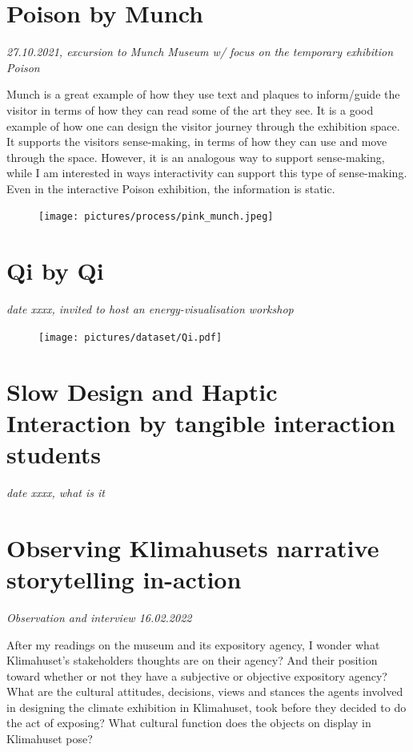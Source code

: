 \section{Poison by Munch}
\par
\emph{27.10.2021, excursion to Munch Museum w/ focus on the temporary exhibition Poison}
\par

Munch is a great example of how they use text and plaques to inform/guide the visitor in terms of how they can read some of the art they see. It is a good example of how one can design the visitor journey through the exhibition space. It supports the visitors sense-making, in terms of how they can use and move through the space. However, it is an analogous way to support sense-making, while I am interested in ways interactivity can support this type of sense-making. Even in the interactive Poison exhibition, the information is static.

\begin{figure}[h]
\texttt{[image: pictures/process/pink\_munch.jpeg]}
\centering 
\end{figure}

\section{Qi by Qi}
\emph{date xxxx, invited to host an energy-visualisation workshop}
\begin{figure}[h]
\texttt{[image: pictures/dataset/Qi.pdf]}
\centering 
\end{figure}

\section{Slow Design and Haptic Interaction by tangible interaction students}
\par
\emph{date xxxx, what is it}


\section{Observing Klimahusets narrative storytelling in-action}
\par
\emph{Observation and interview 16.02.2022}
\par

After my readings on the museum and its expository agency, I wonder what Klimahuset’s stakeholders thoughts are on their agency? And their position toward whether or not they have a subjective or objective expository agency? What are the cultural attitudes, decisions, views and stances the agents involved in designing the climate exhibition in Klimahuset, took before they decided to do the act of exposing? What cultural function does the objects on display in Klimahuset pose? 

